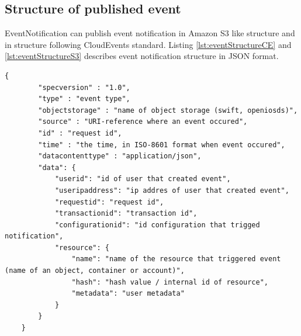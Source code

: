     \subsection{Structure of published event}
    EventNotification can publish event notification in Amazon S3 like structure and in structure following CloudEvents standard. Listing \ref{lst:eventStructureCE} and \ref{lst:eventStructureS3} describes event notification structure in JSON format.

    \begin{lstlisting}[style=jsonStyle, caption=CloudEvents structure of event notification published by EventNotification middleware., label=lst:eventStructureCE]
    {
        "specversion" : "1.0",
        "type" : "event type",
        "objectstorage" : "name of object storage (swift, openiosds)",
        "source" : "URI-reference where an event occured",
        "id" : "request id",
        "time" : "the time, in ISO-8601 format when event occured",
        "datacontenttype" : "application/json",
        "data": {
            "userid": "id of user that created event",
            "useripaddress": "ip addres of user that created event",
            "requestid": "request id",
            "transactionid": "transaction id",
            "configurationid": "id configuration that trigged notification",
            "resource": {
                "name": "name of the resource that triggered event (name of an object, container or account)",
                "hash": "hash value / internal id of resource",
                "metadata": "user metadata"
            }
        }
    }
    \end{lstlisting}

